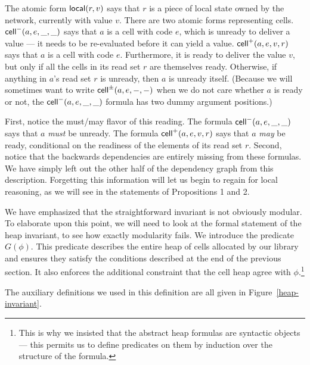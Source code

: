 \documentclass[preprint,natbib]{sigplanconf}
\begin{document}
The atomic form $\mbox{\textsf{{local}}}({r}, {v})$ says that $r$ is a piece of local
state owned by the network, currently with value $v$. There are two
atomic forms representing cells. $\mbox{\textsf{{cell}}}^{-}({a}, {e}, {\_}, {\_})$ says that $a$ is a
cell with code $e$, which is unready to deliver a value --- it needs
to be re-evaluated before it can yield a value. $\mbox{\textsf{{cell}}}^{+}({a}, {e}, {v}, {r})$
says that $a$ is a cell with code $e$. Furthermore, it is ready to
deliver the value $v$, but only if all the cells in its read set $r$
are themselves ready. Otherwise, if anything in $a$'s read set $r$ is 
unready, then $a$ is unready itself. (Because we will sometimes want to
write $\mbox{\textsf{{cell}}}^{\pm}({a}, {e}, {-}, {-})$ when we do not care whether $a$ is ready or
not, the $\mbox{\textsf{{cell}}}^{-}({a}, {e}, {\_}, {\_})$ formula has two dummy argument positions.)

First, notice the must/may flavor of this reading. The formula
$\mbox{\textsf{{cell}}}^{-}({a}, {e}, {\_}, {\_})$ says that $a$ \emph{must} be unready.  The formula
$\mbox{\textsf{{cell}}}^{+}({a}, {e}, {v}, {r})$ says that $a$ \emph{may} be ready, conditional
on the readiness of the elements of its read set $r$. Second, notice
that the backwards dependencies are entirely missing from these
formulas. We have simply left out the other half of the dependency
graph from this description. Forgetting this information will let us
begin to regain for local reasoning, as we will see in the statements
of Propositions 1 and 2. 

We have emphasized that the straightforward invariant is not obviously
modular. To elaborate upon this point, we will need to look at the
formal statement of the heap invariant, to see how exactly modularity
fails. We introduce the predicate $G(\phi)$. This predicate describes
the entire heap of cells allocated by our library and ensures they
satisfy the conditions described at the end of the previous
section. It also enforces the additional constraint that the cell heap
agree with $\phi$.\footnote{This is why we insisted that the abstract
  heap formulas are syntactic objects --- this permits us to define
  predicates on them by induction over the structure of the formula.}
The auxiliary definitions we used in this definition are all given in
Figure~\ref{heap-invariant}. 
\end{document}
